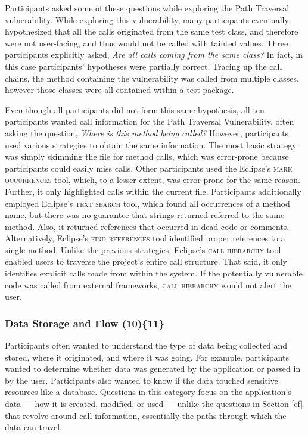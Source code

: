 \documentclass{acm_proc_article-sp}
\begin{document}
Participants asked some of these questions while exploring the Path Traversal vulnerability.
While exploring this vulnerability, many participants eventually hypothesized that all the calls originated from the same test class, and therefore were not user-facing, and thus would not be called with tainted values.
Three participants explicitly asked, \textit{Are all calls coming from the same class?} 
In fact, in this case participants' hypotheses were partially correct. 
Tracing up the call chains, the method containing the vulnerability was called from multiple classes, however those classes were all contained within a test package.

Even though all participants did not form this same hypothesis, all ten participants wanted call information for the Path Traversal Vulnerability, often asking the question, \textit{Where is this method being called?} 
However, participants used various strategies to obtain the same information.
The most basic strategy was simply skimming the file for method calls, which was error-prone because participants could easily miss calls.
Other participants used the Eclipse's \textsc{mark occurrences} tool, which, to a lesser extent, was error-prone for the same reason. 
Further, it only highlighted calls within the current file.
Participants additionally employed Eclipse's \textsc{text search} tool, which found all occurrences of a method name, but there was no guarantee that strings returned referred to the same method.
Also, it returned references that occurred in dead code or comments.
Alternatively, Eclipse's \textsc{find references} tool identified proper references to a single method.
Unlike the previous strategies, Eclipse's \textsc{call hierarchy} tool enabled users to traverse the project's entire call structure.
That said, it only identifies explicit calls made from within the system. 
If the potentially vulnerable code was called from external frameworks, \textsc{call hierarchy} would not alert the user.
 


\subsubsection{\textbf{Data Storage and Flow (10)\{11\}}}\label{dsf}
Participants often wanted to understand the type of data being collected and stored, where it originated, and where it was going. 
For example, participants wanted to determine whether data was generated by the application or passed in by the user. 
Participants also wanted to know if the data touched sensitive resources like a database.
Questions in this category focus on the application's data --- how it is created, modified, or used --- unlike the questions in Section \ref{cf} that revolve around call information, essentially the paths through which the data can travel.
\end{document}
